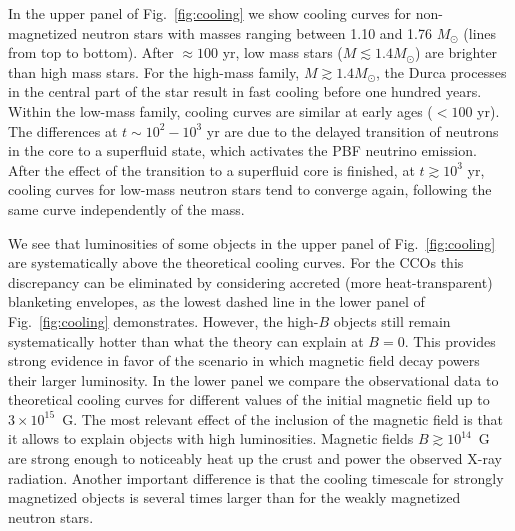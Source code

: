 \documentclass[smallextended]{svjour3}       %
\begin{document}
In the upper panel of Fig.~\ref{fig:cooling} we show cooling
curves for non-magnetized neutron stars with masses ranging
between 1.10 and 1.76 $M_\odot$ (lines from top to bottom).
After $\approx 100$ yr, low mass stars ($M \lesssim 1.4
M_\odot$) are brighter than high mass stars. For the
high-mass family, $M\gtrsim 1.4 M_\odot$, the Durca
processes in the central part of the star result in fast
cooling before one hundred years. Within the low-mass
family, cooling curves are similar at early ages ($<100$
yr). The differences at $t\sim 10^2-10^3$ yr are due to the
delayed transition of neutrons in the core to a superfluid
state, which activates the PBF neutrino emission. After the
effect of the transition to a superfluid core is finished,
at $t\gtrsim 10^3$ yr, cooling curves for low-mass neutron
stars tend to converge again, following the same curve
independently of the mass. 

We see that luminosities of some objects in the upper panel
of Fig.~\ref{fig:cooling} are systematically above the
theoretical cooling curves. For the CCOs this discrepancy
can be eliminated by considering accreted (more
heat-transparent) blanketing envelopes, as the lowest dashed
line in the lower panel of Fig.~\ref{fig:cooling}
demonstrates. However, the high-$B$ objects still remain
systematically hotter than what the theory can explain at
$B=0$. This provides strong evidence in favor of the
scenario in which magnetic field decay powers their larger
luminosity. In the lower panel we compare the observational
data to theoretical cooling curves for different values of
the initial magnetic field up to $3\times 10^{15}$~G. The
most relevant effect of the inclusion of the magnetic field
is that it allows to explain objects with high luminosities.
Magnetic fields $B\gtrsim 10^{14}$~G are strong enough to
noticeably  heat up the crust and power the observed X-ray
radiation. Another important difference is that the cooling
timescale for strongly magnetized objects is several times
larger than for the weakly magnetized neutron stars.

\end{document}
